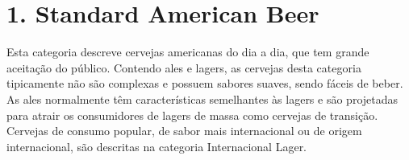 \section*{1. Standard American Beer}

Esta categoria descreve cervejas americanas do dia a dia, que tem grande aceitação do público. Contendo ales e lagers, as cervejas desta categoria tipicamente não são complexas e possuem sabores suaves, sendo fáceis de beber. As ales normalmente têm características semelhantes às lagers e são projetadas para atrair os consumidores de lagers de massa como cervejas de transição. Cervejas de consumo popular, de sabor mais internacional ou de origem internacional, são descritas na categoria Internacional Lager.
